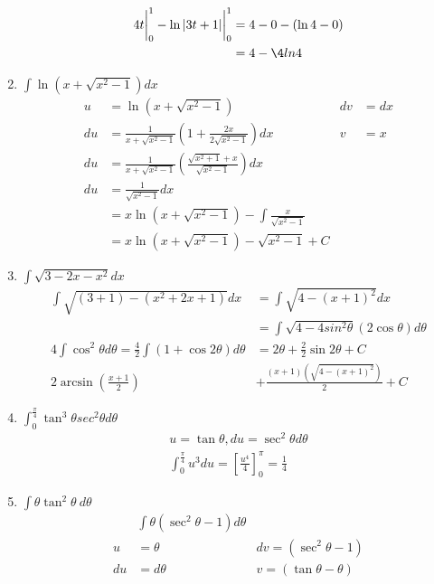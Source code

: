 \documentclass[12pt]{article}
\begin{document}
\begin{enumerate}
\begin{align*}
            4t\bigg|_0^1-\ln|3t+1|\bigg|_0^1 &= 4-0 - (\ln4 - 0) \\
            &= 4 - \4ln4
         \end{align*}
    \addtocounter{enumi}{3}\item $\int\ln\left(x+\sqrt{x^2-1}\right)dx$
        \begin{align*}
            u&= \ln{(x+\sqrt{x^2-1})} & dv &= dx \\
            du&= \frac{1}{x+\sqrt{x^2-1}}\left(1+\frac{2x}{2\sqrt{x^2-1}}\right)dx & v &= x\\
            du&=\frac{1}{x+\sqrt{x^2-1}}\left(\frac{\sqrt{x^2+1}+x}{\sqrt{x^2-1}}\right)dx\\
            du&= \frac{1}{\sqrt{x^2-1}}dx\\
            &=x\ln{(x+\sqrt{x^2-1})}-\int\frac{x}{\sqrt{x^2-1}}\\
            &=x\ln{(x+\sqrt{x^2-1})}-\sqrt{x^2-1} + C
        \end{align*}
    \addtocounter{enumi}{3}\item $\int\sqrt{3-2x-x^2}dx$
        \begin{align*}
            \int\sqrt{(3+1)-(x^2+2x+1)}dx &= \int\sqrt{4-(x+1)^2}dx \\
            &= \int\sqrt{4-4sin^2\theta}(2\cos\theta) d\theta\\
            4\int\cos^2\theta d\theta = \frac{4}{2}\int(1+\cos2\theta)d\theta &= 2\theta + \frac{2}{2}\sin{2\theta}+C\\
            2\arcsin{\left(\frac{x+1}{2}\right)}&+\frac{(x+1)(\sqrt{4-(x+1)^2})}{2} + C
        \end{align*} \newpage
    \addtocounter{enumi}{3}\item $\int^\frac{\pi}{4}_0\tan^3\theta sec^2\theta d\theta$
        \begin{align*}
            u = \tan{\theta}, du = \sec^2\theta d \theta\\
            \int^\frac{\pi}{4}_0 u^3du = \left[\frac{u^4}{4}\right]_0^\pi = \frac{1}{4}
        \end{align*}
    \addtocounter{enumi}{3}\item $\int\theta \tan^2\theta \ d\theta$
        \begin{align*}
            &\int\theta(\sec^2\theta-1) d\theta\\
            u &= \theta  &dv =(\sec^2\theta-1)\\
            du &= d\theta &v =(\tan\theta-\theta)\\

\end{align*}
\end{enumerate}
\end{document}
